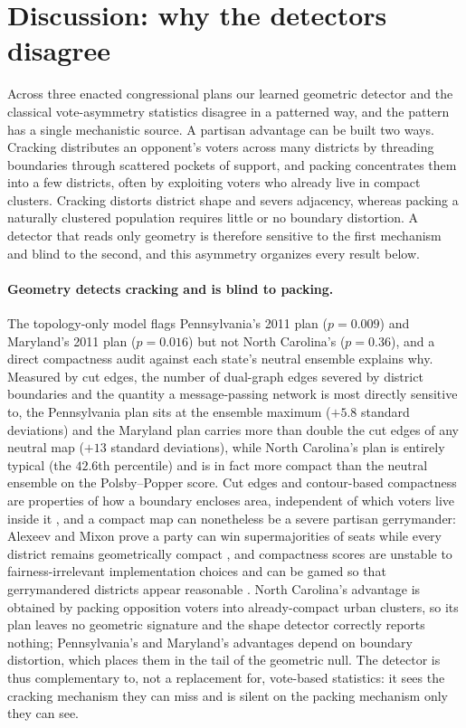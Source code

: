 
\section{Discussion: why the detectors disagree}
\label{sec:discussion}

Across three enacted congressional plans our learned geometric detector and
the classical vote-asymmetry statistics disagree in a patterned way, and the
pattern has a single mechanistic source. A partisan advantage can be built two
ways. Cracking distributes an opponent's voters across many districts by
threading boundaries through scattered pockets of support, and packing
concentrates them into a few districts, often by exploiting voters who already
live in compact clusters. Cracking distorts district shape and severs
adjacency, whereas packing a naturally clustered population requires little or
no boundary distortion. A detector that reads only geometry is therefore
sensitive to the first mechanism and blind to the second, and this asymmetry
organizes every result below.

\paragraph{Geometry detects cracking and is blind to packing.}
The topology-only model flags Pennsylvania's 2011 plan ($p=0.009$) and
Maryland's 2011 plan ($p=0.016$) but not North Carolina's ($p=0.36$), and a
direct compactness audit against each state's neutral ensemble explains why.
Measured by cut edges, the number of dual-graph edges severed by district
boundaries and the quantity a message-passing network is most directly
sensitive to, the Pennsylvania plan sits at the ensemble maximum ($+5.8$
standard deviations) and the Maryland plan carries more than double the cut
edges of any neutral map ($+13$ standard deviations), while North Carolina's
plan is entirely typical (the $42.6$th percentile) and is in fact more compact
than the neutral ensemble on the Polsby--Popper score. Cut edges and
contour-based compactness are properties of how a boundary encloses area,
independent of which voters live inside it \cite{duchin2023discrete,
validi2022cutedges}, and a compact map can nonetheless be a severe partisan
gerrymander: Alexeev and Mixon prove a party can win supermajorities of seats
while every district remains geometrically compact \cite{alexeev2018partisan},
and compactness scores are unstable to fairness-irrelevant implementation
choices and can be gamed so that gerrymandered districts appear reasonable
\cite{barnes2021gerrymandering, polsby1991third}. North Carolina's advantage is
obtained by packing opposition voters into already-compact urban clusters, so
its plan leaves no geometric signature and the shape detector correctly reports
nothing; Pennsylvania's and Maryland's advantages depend on boundary
distortion, which places them in the tail of the geometric null. The detector
is thus complementary to, not a replacement for, vote-based statistics: it sees
the cracking mechanism they can miss and is silent on the packing mechanism
only they can see.


